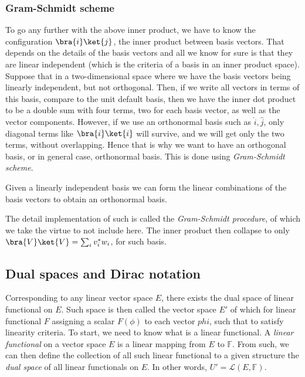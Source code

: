 \subsubsection{Gram-Schmidt scheme}

To go any further with the above inner product, we have to know the configuration $\bra{i}\ket{j}$, the inner product between basis vectors. That depends on the details of the basis vectors and all we know for sure is that they are linear independent (which is the criteria of a basis in an inner product space). Suppose that in a two-dimensional space where we have the basis vectors being linearly independent, but not orthogonal. Then, if we write all vectors in terms of this basis, compare to the unit default basis, then we have the inner dot product to be a double sum with four terms, two for each basis vector, as well as the vector components. However, if we use an orthonormal basis such as $\hat{i},\hat{j}$, only diagonal terms like $\bra{i}\ket{i}$ will survive, and we will get only the two terms, without overlapping. Hence that is why we want to have an orthogonal basis, or in general case, orthonormal basis. This is done using \textit{Gram-Schmidt scheme}.
\begin{theorem}
    Given a linearly independent basis we can form the linear combinations of the basis vectors to obtain an orthonormal basis. 
\end{theorem}
The detail implementation of such is called the \textit{Gram-Schmidt procedure}, of which we take the virtue to not include here. The inner product then collapse to only $\bra{V}\ket{V}=\sum_{i}v^{*}_{i}w_{i}$, for such basis. 

\subsection{Dual spaces and Dirac notation}

Corresponding to any linear vector space $E$, there exists the dual space of linear functional on $E$. Such space is then called the vector space $E'$ of which for linear functional $F$ assigning a scalar $F(\phi)$ to each vector $phi$, such that to satisfy linearity criteria. To start, we need to know what is a linear functional. A \textit{linear functional} on a vector space $E$ is a linear mapping from $E$ to $\mathbb{F}$. From such, we can then define the collection of all such linear functional to a given structure the \textit{dual space} of all linear functionals on $E$. In other words, $U'=\mathcal{L}(E,\mathbb{F})$. 


